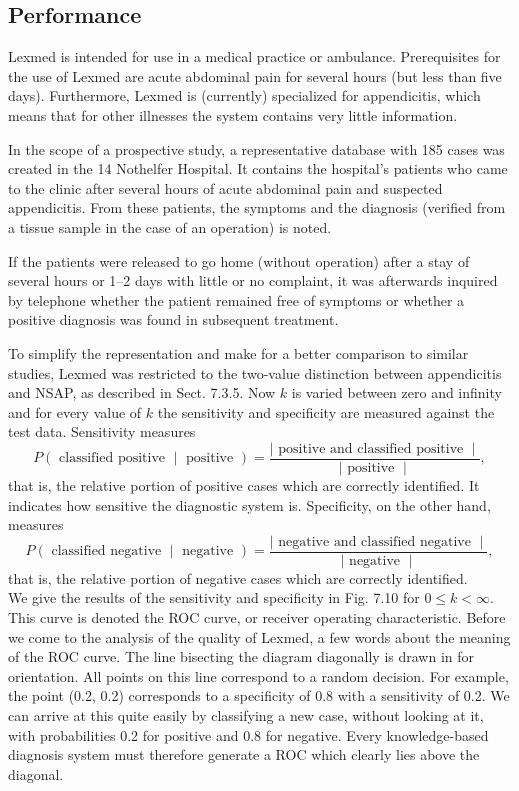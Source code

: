 \documentclass[10pt]{book}
\begin{document}
\subsection{Performance}
Lexmed is intended for use in a medical practice or ambulance. Prerequisites for the use of Lexmed are acute abdominal pain for several hours (but less than five days). Furthermore, Lexmed is (currently) specialized for appendicitis, which means that for other illnesses the system contains very little information.

In the scope of a prospective study, a representative database with 185 cases was created in the 14 Nothelfer Hospital. It contains the hospital's patients who came to the clinic after several hours of acute abdominal pain and suspected appendicitis. From these patients, the symptoms and the diagnosis (verified from a tissue sample in the case of an operation) is noted.

If the patients were released to go home (without operation) after a stay of several hours or 1--2 days with little or no complaint, it was afterwards inquired by telephone whether the patient remained free of symptoms or whether a positive diagnosis was found in subsequent treatment.

To simplify the representation and make for a better comparison to similar studies, Lexmed was restricted to the two-value distinction between appendicitis and NSAP, as described in Sect. 7.3.5. Now $k$ is varied between zero and infinity\\
and for every value of $k$ the sensitivity and specificity are measured against the test data. Sensitivity measures
\begin{equation*}
P(\text { classified positive } \mid \text { positive })=\frac{\mid \text { positive and classified positive } \mid}{\mid \text { positive } \mid}, \tag{7.16}
\end{equation*}
that is, the relative portion of positive cases which are correctly identified. It indicates how sensitive the diagnostic system is. Specificity, on the other hand, measures
\begin{equation*}
P(\text { classified negative } \mid \text { negative })=\frac{\mid \text { negative and classified negative } \mid}{\mid \text { negative } \mid}, \tag{7.17}
\end{equation*}
that is, the relative portion of negative cases which are correctly identified.\\
We give the results of the sensitivity and specificity in Fig. 7.10 for $0 \leq k<\infty$. This curve is denoted the ROC curve, or receiver operating characteristic. Before we come to the analysis of the quality of Lexmed, a few words about the meaning of the ROC curve. The line bisecting the diagram diagonally is drawn in for orientation. All points on this line correspond to a random decision. For example, the point (0.2, 0.2) corresponds to a specificity of 0.8 with a sensitivity of 0.2. We can arrive at this quite easily by classifying a new case, without looking at it, with probabilities 0.2 for positive and 0.8 for negative. Every knowledge-based diagnosis system must therefore generate a ROC which clearly lies above the diagonal.
\end{document}
